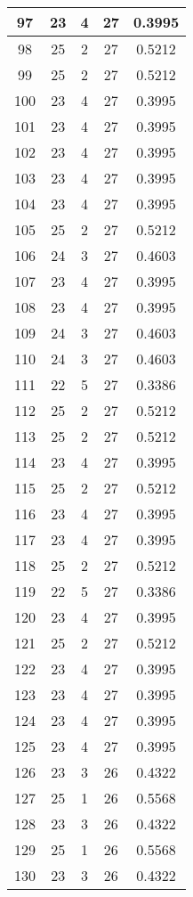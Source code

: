 \documentclass[letterpaper, 12pt]{article}
\begin{document}
\begin{longtable}{|c|c|c|c|c|}
\hline
97 & 23 & 4 & 27 & 0.3995 \\
\hline
98 & 25 & 2 & 27 & 0.5212 \\
\hline
99 & 25 & 2 & 27 & 0.5212 \\
\hline
100 & 23 & 4 & 27 & 0.3995 \\
\hline
101 & 23 & 4 & 27 & 0.3995 \\
\hline
102 & 23 & 4 & 27 & 0.3995 \\
\hline
103 & 23 & 4 & 27 & 0.3995 \\
\hline
104 & 23 & 4 & 27 & 0.3995 \\
\hline
105 & 25 & 2 & 27 & 0.5212 \\
\hline
106 & 24 & 3 & 27 & 0.4603 \\
\hline
107 & 23 & 4 & 27 & 0.3995 \\
\hline
108 & 23 & 4 & 27 & 0.3995 \\
\hline
109 & 24 & 3 & 27 & 0.4603 \\
\hline
110 & 24 & 3 & 27 & 0.4603 \\
\hline
111 & 22 & 5 & 27 & 0.3386 \\
\hline
112 & 25 & 2 & 27 & 0.5212 \\
\hline
113 & 25 & 2 & 27 & 0.5212 \\
\hline
114 & 23 & 4 & 27 & 0.3995 \\
\hline
115 & 25 & 2 & 27 & 0.5212 \\
\hline
116 & 23 & 4 & 27 & 0.3995 \\
\hline
117 & 23 & 4 & 27 & 0.3995 \\
\hline
118 & 25 & 2 & 27 & 0.5212 \\
\hline
119 & 22 & 5 & 27 & 0.3386 \\
\hline
120 & 23 & 4 & 27 & 0.3995 \\
\hline
121 & 25 & 2 & 27 & 0.5212 \\
\hline
122 & 23 & 4 & 27 & 0.3995 \\
\hline
123 & 23 & 4 & 27 & 0.3995 \\
\hline
124 & 23 & 4 & 27 & 0.3995 \\
\hline
125 & 23 & 4 & 27 & 0.3995 \\
\hline
126 & 23 & 3 & 26 & 0.4322 \\
\hline
127 & 25 & 1 & 26 & 0.5568 \\
\hline
128 & 23 & 3 & 26 & 0.4322 \\
\hline
129 & 25 & 1 & 26 & 0.5568 \\
\hline
130 & 23 & 3 & 26 & 0.4322 \\

\end{longtable}
\end{document}
